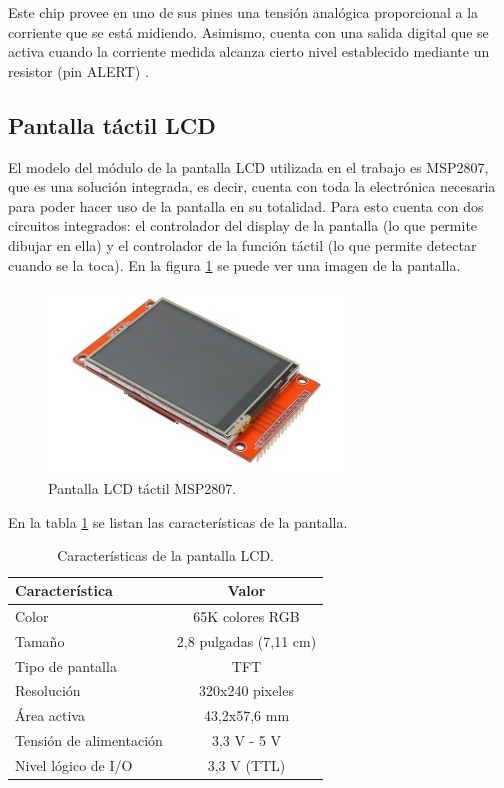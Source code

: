 Este chip provee en uno de sus pines una tensión analógica proporcional a la corriente que se está midiendo. Asimismo, cuenta con una salida digital que se activa cuando la corriente medida alcanza cierto nivel establecido mediante un resistor (pin ALERT) \citep{INA301}.

\subsection{Pantalla táctil LCD}
\label{sec:pantLCD}

El modelo del módulo de la pantalla LCD utilizada en el trabajo es MSP2807, que es una solución integrada, es decir, cuenta con toda la electrónica necesaria para poder hacer uso de la pantalla en su totalidad. Para esto cuenta con dos circuitos integrados: el controlador del display de la pantalla (lo que permite dibujar en ella) y el controlador de la función táctil (lo que permite detectar cuando se la toca). En la figura \ref{fig:pantLCD} se puede ver una imagen de la pantalla.

\begin{figure}[H]
\centering
\includegraphics[width=0.7\textwidth]{./Figures/pant_LCD.png}
\caption{Pantalla LCD táctil MSP2807.}
\label{fig:pantLCD}
\end{figure}

En la tabla \ref{tab:caractLCD} se listan las características de la pantalla.

\begin{table}[H]
	\centering
	\caption{Características de la pantalla LCD.}
	\begin{tabular}{l c}
		\toprule
		\textbf{Característica}	& \textbf{Valor} \\
		\midrule
		Color				& 65K colores RGB \\
		Tamaño				& 2,8 pulgadas (7,11 cm) \\
		Tipo de pantalla	& TFT \\
		Resolución			& 320x240 pixeles \\
		Área activa			& 43,2x57,6 mm \\
		Tensión de alimentación		& 3,3 V - 5 V \\
		Nivel lógico de I/O			& 3,3 V (TTL) \\		
		\bottomrule
		\hline
	\end{tabular}
	\label{tab:caractLCD}
\end{table}

